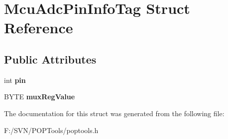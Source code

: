 \hypertarget{struct_mcu_adc_pin_info_tag}{\section{Mcu\-Adc\-Pin\-Info\-Tag Struct Reference}
\label{struct_mcu_adc_pin_info_tag}
}
\subsection*{Public Attributes}
\begin{DoxyCompactItemize}
\item 
\hypertarget{struct_mcu_adc_pin_info_tag_a77334b7f9fe48c3c444b7a2bf9f00027}{int {\bfseries pin}}\label{struct_mcu_adc_pin_info_tag_a77334b7f9fe48c3c444b7a2bf9f00027}

\item 
\hypertarget{struct_mcu_adc_pin_info_tag_aa98492e8112e5a5020de9e73f1a4f644}{B\-Y\-T\-E {\bfseries mux\-Reg\-Value}}\label{struct_mcu_adc_pin_info_tag_aa98492e8112e5a5020de9e73f1a4f644}

\end{DoxyCompactItemize}


The documentation for this struct was generated from the following file\-:\begin{DoxyCompactItemize}
\item 
F\-:/\-S\-V\-N/\-P\-O\-P\-Tools/poptools.\-h\end{DoxyCompactItemize}
